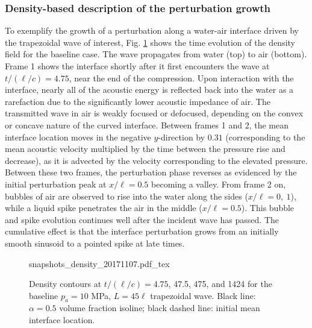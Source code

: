 \documentclass{jfm}%
\begin{document}
\subsubsection{Density-based description of the perturbation growth}

To exemplify the growth of a perturbation along a water-air interface
driven by the trapezoidal wave of interest, Fig.
\ref{fig:interface_snapshots} shows the time evolution of the density
field for the baseline case. The wave propagates from water (top) to
air (bottom). Frame 1 shows the interface shortly after it first
encounters the wave at $t/(\ell/c)=4.75$, near the end of the compression. Upon
interaction with the interface, nearly all of the acoustic energy is
reflected back into the water as a rarefaction due to the
significantly lower acoustic impedance of air. The transmitted wave in
air is weakly focused or defocused, depending on the convex or concave
nature of the curved interface. Between frames 1 and 2, the mean
interface location moves in the negative $y$-direction by $0.31$
(corresponding to the mean acoustic velocity multiplied by the time
between the pressure rise and decrease), as it is advected by the
velocity corresponding to the elevated pressure. Between these two
frames, the perturbation phase reverses as evidenced by the initial
perturbation peak at $x/\ell=0.5$ becoming a valley. From frame 2 on,
bubbles of air are observed to rise into the water along the sides
($x/\ell=0,~ 1$), while a liquid spike penetrates the air in the middle
($x/\ell=0.5$). This bubble and spike evolution continues well after
the incident wave has passed. The cumulative effect is that the
interface perturbation grows from an initially smooth sinusoid to a
pointed spike at late times.
% 
\begin{figure}
  \centering
  \def\svgwidth{0.95\textwidth}
  {snapshots_density_20171107.pdf_tex}
  \caption[The evolution of the acoustically perturbed interface]
          {Density contours at $t/(\ell/c)=4.75$, 47.5, 475, and 1424 for the
            baseline $p_a = 10$ MPa, $L=45\ell$ trapezoidal
            wave. Black line: $\alpha=0.5$ volume fraction isoline;
            black dashed line: initial mean interface location.}
  \label{fig:interface_snapshots}
\end{figure}
\end{document}
